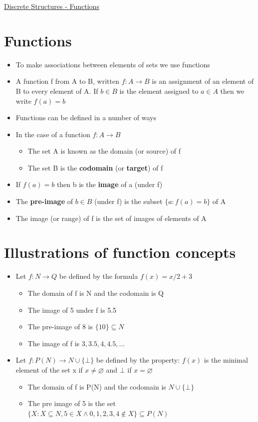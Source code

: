 \documentclass{article}[18pt]
\begin{document}
\begin{center}
\underline{\huge Discrete Structures - Functions}
\end{center}
\section{Functions}
\begin{itemize}
	\item To make associations between elements of sets we use functions
	\item A function f from A to B, written $f:A\rightarrow B$ is an assignment of an element of B to every element of A. If $b\in B$ is the element assigned to $a\in A$ then we write $f(a)=b$
	\item Functions can be defined in a number of ways
	\item In the case of a function $f:A\rightarrow B$
	\begin{itemize}
		\item The set A is known as the domain (or source) of f
		\item The set B is the \textbf{codomain} (or \textbf{target}) of f
	\end{itemize}
	\item If $f(a)=b$ then b is the \textbf{image} of a (under f)
	\item The \textbf{pre-image} of $b\in B$ (under f) is the subset $\{a: f(a)=b\}$ of A
	\item The image (or range) of f is the set of images of elements of A
\end{itemize}
\section{Illustrations of function concepts}
\begin{itemize}
	\item Let $f: N\rightarrow Q$ be defined by the formula $f(x)=x/2+3$
	\begin{itemize}
		\item The domain of f is N and the codomain is Q
		\item The image of 5 under f is 5.5
		\item The pre-image of 8 is $\{10\}\subseteq N$
		\item The image of f is ${3,3.5,4,4.5,...}$ 
	\end{itemize}
	\item Let $f:P(N)\rightarrow N\cup \{\bot \}$ be defined by the property: $f(x)$ is the minimal element of the set x if $x\neq \varnothing$ and $\bot$ if $x=\varnothing$
	\begin{itemize}
		\item The domain of f is P(N) and the codomain is $N\cup\{\bot\}$
		\item The pre image of 5 is the set  $\{ X : X \subseteq N , 5 \in X \wedge 0,1,2,3,4 \notin X \} \subseteq P ( N )$
	\end{itemize}
\end{itemize}
\end{document}
